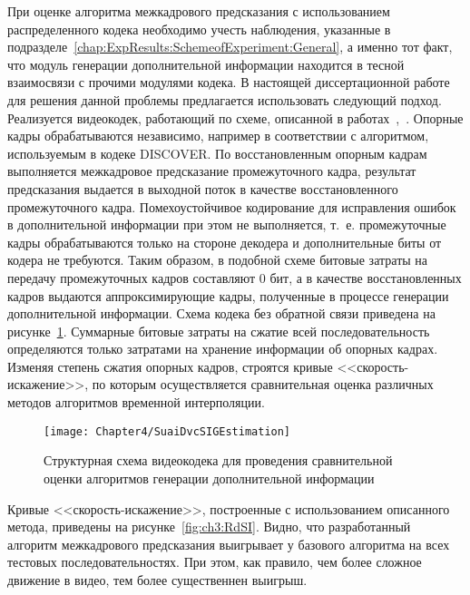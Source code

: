 При оценке алгоритма межкадрового предсказания с использованием распределенного кодека необходимо учесть наблюдения, указанные в подразделе~\ref{chap:ExpResults:SchemeofExperiment:General}, а именно тот факт, что модуль генерации дополнительной информации находится в тесной взаимосвязи с прочими модулями кодека. В настоящей диссертационной работе для решения данной проблемы предлагается использовать следующий подход. Реализуется видеокодек, работающий по схеме, описанной в работах~\cite{Gilmutdinov2012},~\cite{Priborostroenie2013}. Опорные кадры обрабатываются независимо, например в соответствии с алгоритмом, используемым в кодеке DISCOVER. По восстановленным опорным кадрам выполняется межкадровое предсказание промежуточного кадра, результат предсказания выдается в выходной поток в качестве восстановленного промежуточного кадра. Помехоустойчивое кодирование для исправления ошибок в дополнительной информации при этом не выполняется, т.~е. промежуточные кадры обрабатываются только на стороне декодера и дополнительные биты от кодера не требуются. Таким образом, в подобной схеме битовые затраты на передачу промежуточных кадров составляют $0$ бит, а в качестве восстановленных кадров выдаются аппроксимирующие кадры, полученные в процессе генерации дополнительной информации. Схема кодека без обратной связи приведена на рисунке~\ref{fig:ch3:SuaiDvcSIGEstimation}. Суммарные битовые затраты на сжатие всей последовательность определяются только затратами на хранение информации об опорных кадрах. Изменяя степень сжатия опорных кадров, строятся кривые <<скорость-искажение>>, по которым осуществляется сравнительная оценка различных методов алгоритмов временной интерполяции.

\begin{figure}[htb]
\begin{center}
\texttt{[image: Chapter4/SuaiDvcSIGEstimation]}
\end{center}
\caption{Структурная схема видеокодека для проведения сравнительной оценки алгоритмов генерации дополнительной информации}
\label{fig:ch3:SuaiDvcSIGEstimation}
\end{figure}

Кривые <<скорость-искажение>>, построенные с использованием описанного метода, приведены на рисунке~\ref{fig:ch3:RdSI}. Видно, что разработанный алгоритм межкадрового предсказания выигрывает у базового алгоритма на всех тестовых последовательностях. При этом, как правило, чем более сложное движение в видео, тем более существеннен выигрыш.

